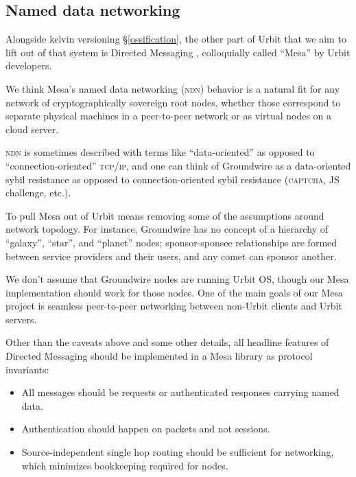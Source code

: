 \documentclass[twoside]{article}
\begin{document}
\subsection{Named data networking}\label{named-data-networking}

Alongside kelvin versioning \S\ref{ossification}, the other part of Urbit that we aim
to lift out of that system is Directed Messaging \citep{DirectedMessaging2026}, colloquially called
``Mesa'' by Urbit developers.

We think Mesa's named data networking (\textsc{ndn}) behavior is a natural fit
for any network of cryptographically sovereign root nodes, whether those
correspond to separate physical machines in a peer-to-peer network or as
virtual nodes on a cloud server.

\textsc{ndn} is sometimes described with terms like ``data-oriented'' as opposed
to ``connection-oriented'' \textsc{tcp/ip}, and one can think of Groundwire as a
data-oriented sybil resistance as opposed to connection-oriented sybil
resistance (\textsc{captcha}, JS challenge, etc.).

To pull Mesa out of Urbit means removing some of the assumptions around
network topology. For instance, Groundwire has no concept of a hierarchy
of ``galaxy'', ``star'', and ``planet'' nodes; sponsor-sponsee
relationships are formed between service providers and their users, and
any comet can sponsor another.

We don't assume that Groundwire nodes are running Urbit OS, though our
Mesa implementation should work for those nodes. One of the main goals
of our Mesa project is seamless peer-to-peer networking between
non-Urbit clients and Urbit servers.

Other than the caveats above and some other details, all headline
features of Directed Messaging should be implemented in a Mesa library
as protocol invariants:

\begin{itemize}[noitemsep,topsep=2pt]

\item
  All messages should be requests or authenticated responses carrying
  named data.
\item
  Authentication should happen on packets and not sessions.
\item
  Source-independent single hop routing should be sufficient for
  networking, which minimizes bookkeeping required for nodes.
\end{itemize}
\end{document}
